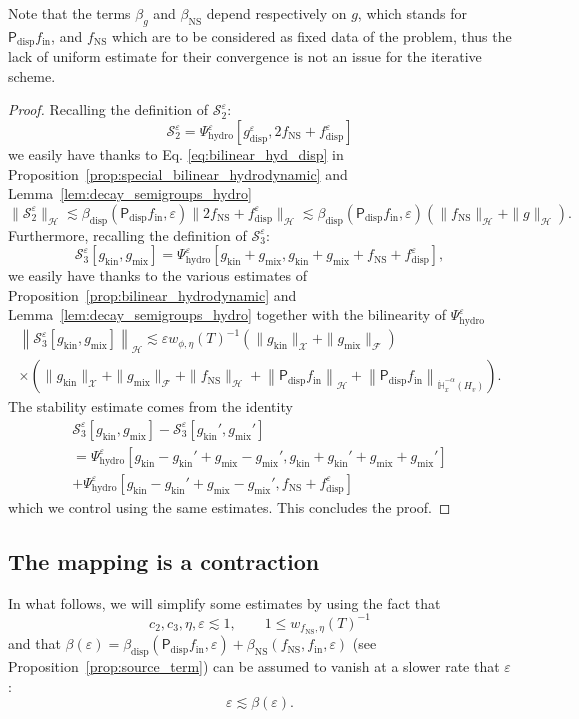 \documentclass[AHL,Unicode,longabstracts,published]{cedram}
\newcommand{\ini}{\mathrm{in}}
\newcommand{\ns}{\mathrm{NS}}
\newcommand{\hyd}{\mathrm{hydro}}
\newcommand{\mix}{\mathrm{mix}}
\newcommand{\kin}{\mathrm{kin}}
\newcommand{\disp}{\mathrm{disp}}
\newcommand{\bbH}{\mathbb{H}}
\newcommand{\HH}{\mathcal{H}}
\newcommand{\PP}{\mathsf{P}}
\renewcommand{\SS}{\mathcal{S}}
\newcommand{\FFF}{\mathscr{F}}
\newcommand{\HHH}{\mathscr{H}}
\newcommand{\GGG}{\mathscr{X}}
\newcommand{\Ss}{H}
\newcommand{\SSs}{\HH}
\newcommand{\SSSs}{\HHH}
\newcommand{\SSSl}{\GGG}
\newcommand{\SSSm}{\FFF}
\renewcommand*\le{\leqslant}
\newcommand*\eps{{\varepsilon}}
\begin{document}
\begin{rema}
Note that the terms $\beta_{g}$ and $\beta_\ns$ depend respectively on $g$, which stands for~$\PP_\disp f_\ini$, and $f_\ns$ which are to be considered as fixed data of the problem, thus the lack of uniform estimate for their convergence is not an issue for the iterative scheme.
\end{rema}
\begin{proof}
Recalling the definition of $\SS^\eps_2$:
\[
\SS^\eps_2 = \Psi^\eps_\hyd\left[g^\eps_\disp, 2 f_\ns + f^\eps_\disp \right]
\]
we easily have thanks to Eq. \eqref{eq:bilinear_hyd_disp} in Proposition~\ref{prop:special_bilinear_hydrodynamic} and Lemma~\ref{lem:decay_semigroups_hydro}
\[
\| \SS^\eps_2 \|_\SSSs \lesssim \beta_\disp(\PP_\disp f_\ini, \eps) \| 2f_\ns + f^\eps_\disp\|_\SSSs \lesssim \beta_\disp(\PP_\disp f_\ini, \eps) \left(\| f_\ns \|_\SSSs + \| g \|_{\SSs}\right).
\]
Furthermore, recalling the definition of $\SS^\eps_3$:
\[
\SS^\eps_3[g_\kin, g_\mix] = \Psi^\eps_\hyd\left[g_\kin + g_\mix, g_\kin + g_\mix + f_\ns + f^\eps_\disp \right],
\]
we easily have thanks to the various estimates of Proposition~\ref{prop:bilinear_hydrodynamic} and Lemma~\ref{lem:decay_semigroups_hydro} together with the bilinearity of $\Psi^\eps_\hyd$
\begin{multline*}
\left\| \SS^\eps_3[g_\kin, g_\mix] \right\|_{ \SSSs}
\lesssim \eps w_{\phi, \eta}(T)^{-1} \left(\| g_\kin \|_\SSSl + \| g_\mix \|_\SSSm \right) \\
\times \left(\| g_\kin \|_\SSSl + \| g_\mix \|_\SSSm + \| f_\ns \|_\SSSs + \left\| \PP_\disp f_\ini \right\|_{ \SSs } + \left\| \PP_\disp f_\ini \right\|_{ \dot{\bbH}^{-\alpha}_x \left(\Ss_v \right) } \right).
\end{multline*}
The stability estimate comes from the identity
\begin{multline*}
\SS^\eps_3[g_\kin, g_\mix] - \SS^\eps_3\left[g_\kin', g_\mix'\right] \\
= \Psi^\eps_\hyd\left[g_\kin - g_\kin' + g_\mix - g_\mix', g_\kin + g_\kin' + g_\mix + g_\mix' \right] \\
 + \Psi^\eps_\hyd\left[g_\kin - g_\kin' + g_\mix - g_\mix', f_\ns + f_\disp^\eps \right]
\end{multline*}
which we control using the same estimates. This concludes the proof.
\end{proof}


\subsection{The mapping is a contraction}\label{scn:mapping_contraction}
In what follows, we will simplify some estimates by using the fact that
\[
c_2, c_3, \eta, \eps \lesssim 1, \qquad 1 \le w_{f_\ns, \eta}(T)^{-1}
\]
and that $\beta(\eps) = {\beta_{\disp}}(\PP_\disp f_\ini, \eps) + \beta_{\ns}(f_\ns, f_\ini, \eps)$ (see Proposition~\ref{prop:source_term}) can be assumed to vanish at a slower rate that $\eps$:
\[
\eps \lesssim \beta(\eps).
\]
\end{document}
